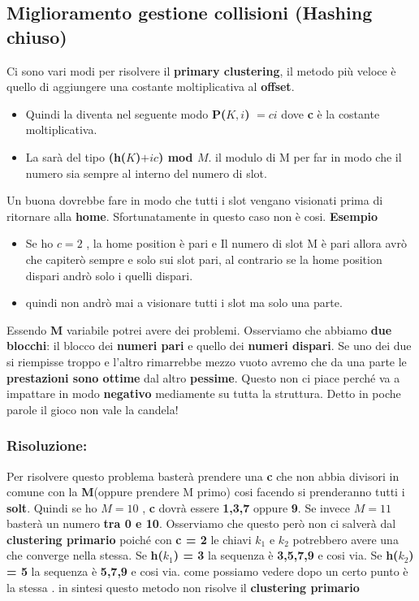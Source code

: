 \subsection{Miglioramento gestione collisioni (Hashing chiuso)}
Ci sono vari modi per risolvere il  \textbf{primary clustering}, il metodo più veloce è quello di aggiungere una costante moltiplicativa al \textbf{offset}.\newline
\begin{tcolorbox}
    \begin{itemize}
        \item Quindi la \textbf{\textcolor{blue}{}} diventa nel seguente modo \textbf{P($K,i$)} $= ci$ dove \textbf{c} è la costante moltiplicativa.
        \item La \textbf{\textcolor{blue}{}} sarà del tipo \textbf{(h($K$)$ + ic$) mod $M$}. il modulo di M per far in modo che il numero sia sempre al interno del numero di slot.
    \end{itemize}
\end{tcolorbox}
Un buona \textbf{\textcolor{blue}{}} dovrebbe fare in modo che tutti i slot vengano visionati prima di ritornare alla \textbf{home}. Sfortunatamente in questo caso non è cosi.\newpage
\textbf{Esempio}
\begin{itemize}
    \item Se ho $c = 2$ , la home position  è pari e Il numero di slot M è pari allora avrò che capiterò sempre e solo sui slot pari, al contrario se la home position dispari andrò solo i quelli dispari.
    \item quindi non andrò mai a visionare tutti i slot ma solo una parte.
\end{itemize}
Essendo \textbf{M} variabile potrei avere dei problemi. Osserviamo che abbiamo \textbf{due blocchi}: il blocco dei  \textbf{numeri pari} e quello dei \textbf{numeri dispari}. Se uno dei due si riempisse troppo e l'altro rimarrebbe mezzo vuoto avremo che da una parte le\textbf{ prestazioni sono ottime} dal altro \textbf{pessime}. Questo non ci piace perché va a impattare in modo\textbf{ negativo} mediamente su tutta la struttura. Detto in poche parole il gioco non vale la candela!
\subsubsection{Risoluzione:}
Per risolvere questo problema basterà prendere una \textbf{c} che non abbia divisori in comune con la \textbf{M}(oppure prendere M primo) cosi facendo si prenderanno tutti i \textbf{solt}. Quindi se ho $M = 10$ , \textbf{c} dovrà essere \textbf{1,3,7} oppure \textbf{9}. Se invece $M = 11$ basterà un numero \textbf{tra 0 e 10}. Osserviamo che questo però non ci salverà dal \textbf{clustering primario} poiché con \textbf{c = 2} le chiavi $k_1$ e $k_2$ potrebbero avere una \textbf{\textcolor{blue}{}} che converge nella stessa. Se \textbf{h($k_1$) = 3} la sequenza è \textbf{3,5,7,9} e cosi via. Se \textbf{h($k_2$) = 5} la sequenza è \textbf{5,7,9} e cosi via. come possiamo vedere dopo un certo punto è la stessa \textbf{\textcolor{blue}{}}. in sintesi questo metodo non risolve il \textbf{clustering primario}

